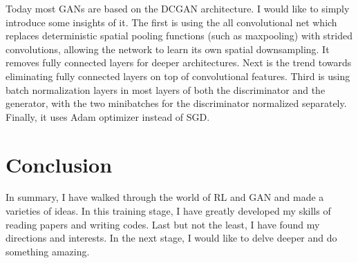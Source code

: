 \documentclass[10pt,twocolumn,letterpaper]{article}
\begin{document}
Today most GANs are based on the DCGAN architecture. I would like to simply introduce some insights of it. The first is 
using the all convolutional net  which replaces deterministic spatial pooling functions (such as maxpooling) with strided convolutions, allowing the network to learn its own spatial downsampling. It removes fully connected layers for deeper architectures. Next is the trend towards eliminating fully connected layers on top of convolutional features.  Third is using batch normalization layers in most layers of both the discriminator and the generator, with the two minibatches for the discriminator normalized separately. Finally, it uses Adam optimizer instead of SGD.

\section{Conclusion}

In summary, I have walked through the world of RL and GAN and made a varieties of ideas.  In this training stage, I have 
greatly developed my skills of reading papers and writing codes. Last but not the least, I have found my directions and 
interests. In the next stage, I would like to delve deeper and do something amazing.

{\small


}
\end{document}
